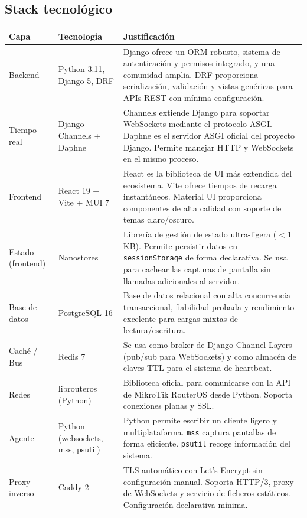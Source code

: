 \documentclass[12pt, a4paper, twoside]{article}
\begin{document}
\subsection{Stack tecnológico}

\begin{longtable}{llp{7cm}}
  \toprule
  \textbf{Capa} & \textbf{Tecnología} & \textbf{Justificación} \\
  \midrule
  \endhead
  Backend & Python 3.11, Django 5, DRF & Django ofrece un ORM robusto, sistema de autenticación y permisos integrado, y una comunidad amplia. DRF proporciona serialización, validación y vistas genéricas para APIs REST con mínima configuración. \\
  \addlinespace
  Tiempo real & Django Channels + Daphne & Channels extiende Django para soportar WebSockets mediante el protocolo ASGI. Daphne es el servidor ASGI oficial del proyecto Django. Permite manejar HTTP y WebSockets en el mismo proceso. \\
  \addlinespace
  Frontend & React 19 + Vite + MUI 7 & React es la biblioteca de UI más extendida del ecosistema. Vite ofrece tiempos de recarga instantáneos. Material UI proporciona componentes de alta calidad con soporte de temas claro/oscuro. \\
  \addlinespace
  Estado (frontend) & Nanostores & Librería de gestión de estado ultra-ligera ($<$1 KB). Permite persistir datos en \texttt{sessionStorage} de forma declarativa. Se usa para cachear las capturas de pantalla sin llamadas adicionales al servidor. \\
  \addlinespace
  Base de datos & PostgreSQL 16 & Base de datos relacional con alta concurrencia transaccional, fiabilidad probada y rendimiento excelente para cargas mixtas de lectura/escritura. \\
  \addlinespace
  Caché / Bus & Redis 7 & Se usa como broker de Django Channel Layers (pub/sub para WebSockets) y como almacén de claves TTL para el sistema de heartbeat. \\
  \addlinespace
  Redes & librouteros (Python) & Biblioteca oficial para comunicarse con la API de MikroTik RouterOS desde Python. Soporta conexiones planas y SSL. \\
  \addlinespace
  Agente & Python (websockets, mss, psutil) & Python permite escribir un cliente ligero y multiplataforma. \texttt{mss} captura pantallas de forma eficiente. \texttt{psutil} recoge información del sistema. \\
  \addlinespace
  Proxy inverso & Caddy 2 & TLS automático con Let's Encrypt sin configuración manual. Soporta HTTP/3, proxy de WebSockets y servicio de ficheros estáticos. Configuración declarativa mínima. \\

\end{longtable}
\end{document}
